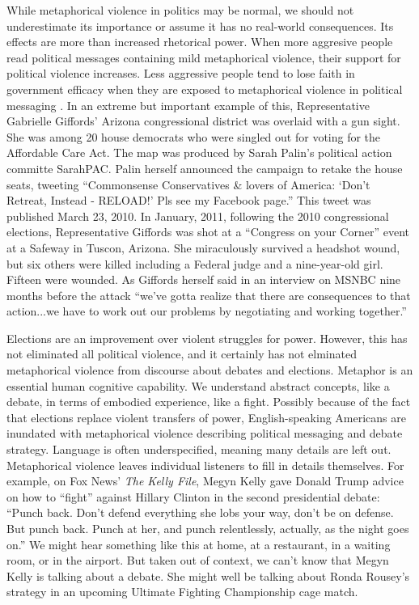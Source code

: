 While metaphorical violence in politics may be normal, we should not underestimate its
importance or assume it has no real-world consequences. 
Its effects are more than increased rhetorical power. 
When more aggresive people read political messages containing mild metaphorical violence, 
their support for political violence increases. Less aggressive people tend to
lose faith in government efficacy when they are exposed to metaphorical violence
in political messaging \cite{Kalmoe2014}. 
In an extreme but important example of this, Representative
Gabrielle Giffords' Arizona congressional district was overlaid with a gun sight. 
She was among 20 house democrats who were singled out for voting for the 
Affordable Care Act. The map was produced by Sarah Palin's political action 
committe SarahPAC. Palin herself announced the campaign to retake the house 
seats, tweeting ``Commonsense Conservatives \& lovers of America: `Don't Retreat,
Instead - RELOAD!' Pls see my Facebook page.'' This tweet was published March
23, 2010. In January, 2011, following the 2010 congressional elections, 
Representative
Giffords was shot at a ``Congress on your Corner'' event at a Safeway in 
Tuscon, Arizona. She miraculously survived a headshot wound, but six others
were killed including a Federal judge and a nine-year-old girl. Fifteen were
wounded. As Giffords herself said in an interview on MSNBC nine months before
the attack ``we've gotta realize that there are consequences to that action...we have to work out 
our problems by negotiating and working together.''

Elections are an improvement over violent struggles for power. However, this
has not eliminated all political violence, and it certainly has not elminated
metaphorical violence from discourse about debates and elections. 
Metaphor is an essential human cognitive capability. We understand abstract
concepts, like a debate, in terms of embodied experience, like a fight. Possibly
because of the fact that elections replace violent transfers of power, 
English-speaking Americans are inundated with metaphorical violence describing
political messaging and debate strategy. Language is often underspecified, 
meaning many details are left out. Metaphorical violence leaves individual 
listeners to fill in details
themselves. For example, on Fox News' \textit{The Kelly File}, Megyn Kelly
gave Donald Trump advice on how to ``fight'' against Hillary Clinton in the
second presidential debate: ``Punch back. Don't defend everything she lobs your
way, don't be on defense. But punch back. Punch at her, and punch relentlessly,
actually, as the night goes on.'' We might hear something like this at home,
at a restaurant, in a waiting room, or in the airport. But taken out of context,
we can't know that Megyn Kelly is talking about a debate. She might well be
talking about Ronda Rousey's strategy in an upcoming Ultimate Fighting Championship
cage match.

